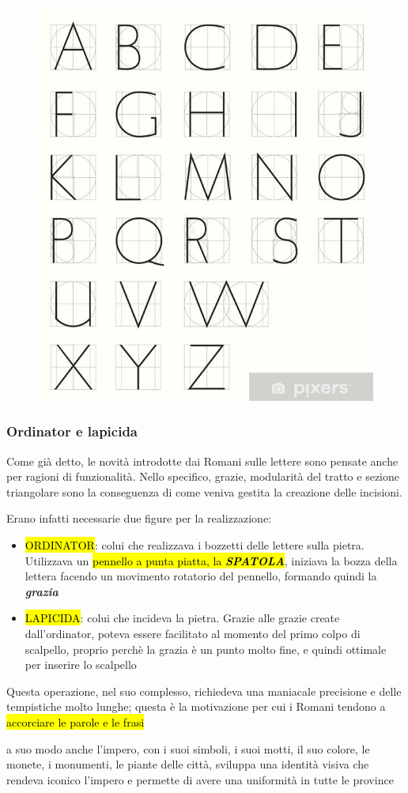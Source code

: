     \begin{figure}[H]
    \centering
    \includegraphics[width=0.4\linewidth]{blocco_3 - storia della scrittura/imgs/carte-da-parati-capitali-romane-monoline-con-griglia-geometrica.jpg.jpg}
\end{figure}
    \subsubsection{Ordinator e lapicida}
    Come già detto, le novità introdotte dai Romani sulle lettere sono pensate anche per ragioni di funzionalità.
    Nello specifico, grazie, modularità del tratto e sezione triangolare sono la conseguenza di come veniva gestita la creazione delle incisioni.

    Erano infatti necessarie due figure per la realizzazione:
    \begin{itemize}
        \item \hl{ORDINATOR}: colui che realizzava i bozzetti delle lettere sulla pietra. Utilizzava un \hl{pennello a punta piatta, la \textbf{\textit{SPATOLA}}}, iniziava la bozza della lettera facendo un movimento rotatorio del pennello, formando quindi la \textbf{\textit{grazia}}
        \item  \hl{LAPICIDA}: colui che incideva la pietra. Grazie alle grazie create dall'ordinator, poteva essere facilitato al momento del primo colpo di scalpello, proprio perchè la grazia è un punto molto fine, e quindi ottimale per inserire lo scalpello
    \end{itemize}

    Questa operazione, nel suo complesso, richiedeva una maniacale precisione e delle tempistiche molto lunghe; questa è la motivazione per cui i Romani tendono a \hl{accorciare le parole e le frasi}
    

\begin{mdframed}[style=mystyle,frametitle=Roma come i moderni brand]
     a suo modo anche l'impero, con i suoi simboli, i suoi motti, il suo colore, le monete, i monumenti, le piante delle città, sviluppa una identità visiva che rendeva iconico l'impero e permette di avere una uniformità in tutte le province
    \end{mdframed}


